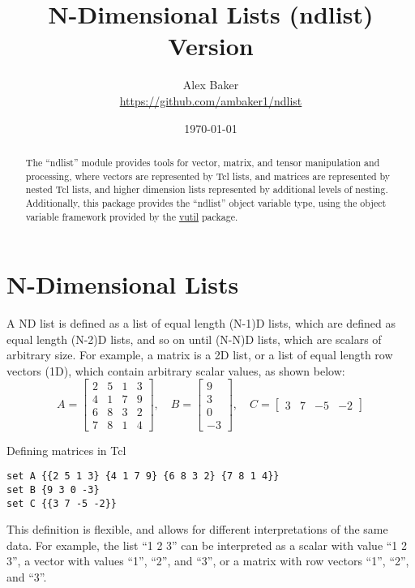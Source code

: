 \documentclass{article}
\title{\Huge{N-Dimensional Lists (ndlist)}\\\large Version \version}
\author{Alex Baker\\\small\url{https://github.com/ambaker1/ndlist}}
\date{\small\today}
\begin{document}
\maketitle
\begin{abstract}
\begin{center}
The ``ndlist'' module provides tools for vector, matrix, and tensor manipulation and processing, where vectors are represented by Tcl lists, and matrices are represented by nested Tcl lists, and higher dimension lists represented by additional levels of nesting. 
Additionally, this package provides the ``ndlist'' object variable type, using the object variable framework provided by the \textcolor{blue}{\href{https://github.com/ambaker1/vutil}{vutil}} package.
\end{center}
\end{abstract}
\clearpage
\section{N-Dimensional Lists}
A ND list is defined as a list of equal length (N-1)D lists, which are defined as equal length (N-2)D lists, and so on until (N-N)D lists, which are scalars of arbitrary size.
For example, a matrix is a 2D list, or a list of equal length row vectors (1D), which contain arbitrary scalar values, as shown below:
\begin{equation*}\label{eq:matrix_AB}
A=\begin{bmatrix}
2 & 5 & 1 & 3 \\
4 & 1 & 7 & 9 \\
6 & 8 & 3 & 2 \\
7 & 8 & 1 & 4
\end{bmatrix},\quad
B=\begin{bmatrix}
9 \\ 3 \\ 0 \\ -3
\end{bmatrix},\quad
C = \begin{bmatrix}
3 & 7 & -5 & -2
\end{bmatrix}
\end{equation*}
\begin{example}[label=ex:matrix_AB]{Defining matrices in Tcl}
\begin{lstlisting}
set A {{2 5 1 3} {4 1 7 9} {6 8 3 2} {7 8 1 4}}
set B {9 3 0 -3}
set C {{3 7 -5 -2}}
\end{lstlisting}
\end{example}

This definition is flexible, and allows for different interpretations of the same data. For example, the list ``1 2 3'' can be interpreted as a scalar with value ``1 2 3'', a vector with values ``1'', ``2'', and ``3'', or a matrix with row vectors ``1'', ``2'', and ``3''.
\end{document}

